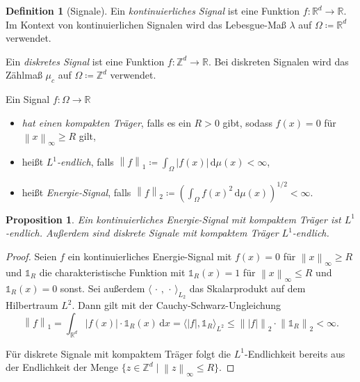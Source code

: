 \documentclass[paper=a4, 	%
		fontsize=11pt,
		abstract=true, 	%
		headsepline, 	%
		notitlepage	%
		]{scrartcl}
\newtheorem{proposition}[theorem]{Proposition}
\theoremstyle{definition}
\newtheorem{definition}[theorem]{Definition}
\newcommand{\R}{\mathbb{R}}
\newcommand{\Z}{\mathbb{Z}}
\newcommand{\diff}{\,\textrm{d}}
\newcommand{\norm}[1]{\left\lVert#1\right\rVert}
\newcommand{\abs}[1]{\left\lvert#1\right\rvert}
\begin{document}
\newcommand{\llambda}{\lambda}
\newcommand{\cmeasure}{\mu_c}

\begin{definition}[Signale]
    Ein \emph{kontinuierliches Signal} ist eine Funktion $f: \R^d\rightarrow \R$.
    Im Kontext von kontinuierlichen Signalen wird das Lebesgue-Maß $\llambda$ auf $\Omega\coloneqq \R^d$ verwendet.

    Ein \emph{diskretes Signal} ist eine Funktion $f: \Z^d \rightarrow \R$.
    Bei diskreten Signalen wird das Zählmaß $\cmeasure$ auf $\Omega\coloneqq \Z^d$ verwendet.

    Ein Signal $f: \Omega \rightarrow \R$
    \begin{itemize}
        \item \emph{hat einen kompakten Träger}, falls es ein $R > 0$ gibt, sodass $f(x) = 0$ für $\norm{x}_\infty \geq R$ gilt,
        \item heißt \emph{$L^1$-endlich}, falls $\norm{f}_1 \coloneqq \int_{\Omega} \abs{f(x)} \diff \mu(x) < \infty$,
        \item heißt \emph{Energie-Signal}, falls $\norm{f}_2 \coloneqq \left(\int_{\Omega} f(x)^2 \diff \mu(x) \right)^{1/2} < \infty$.
    \end{itemize}
\end{definition}

\begin{proposition}
    Ein kontinuierliches Energie-Signal mit kompaktem Träger ist $L^1$-endlich.
    Außerdem sind diskrete Signale mit kompaktem Träger $L^1$-endlich.
\end{proposition}
\begin{proof}
    Seien $f$ ein kontinuierliches Energie-Signal mit $f(x) = 0$ für $\norm{x}_{\infty} \geq R$ und $\mathbb{1}_R$ die charakteristische Funktion mit $\mathbb{1}_R(x) = 1$ für $\norm{x}_\infty \leq R$ und $\mathbb{1}_R(x) = 0$ sonst.
    Sei außerdem $\langle \,\cdot\, , \,\cdot\, \rangle_{L_2}$ das Skalarprodukt auf dem Hilbertraum $L^2$.
    Dann gilt mit der Cauchy-Schwarz-Ungleichung
    \[
        \norm{f}_1 
        = \int_{\R^d} \abs{f(x)} \cdot \mathbb{1}_R(x) \diff x
        = \langle \abs{f}, \mathbb{1}_R \rangle_{L^2}
        \leq \norm{\abs{f}}_2 \cdot \norm{\mathbb{1}_R}_2 < \infty .
    \]

    Für diskrete Signale mit kompaktem Träger folgt die $L^1$-Endlichkeit bereits aus der Endlichkeit der Menge $\{ z\in\Z^d \mid \norm{z}_{\infty} \leq R\}$.
\end{proof}
\end{document}
